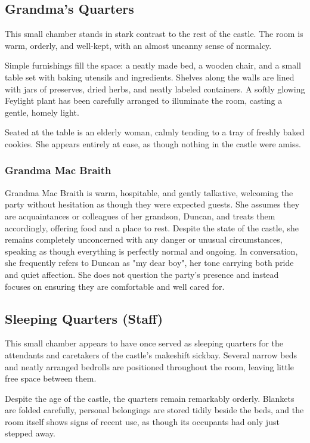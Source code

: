 \subsection*{ Grandma's Quarters}
{\entryfont This small chamber stands in stark contrast to the rest of the castle. The room is warm, orderly, and well-kept, with an almost uncanny sense of normalcy.

Simple furnishings fill the space: a neatly made bed, a wooden chair, and a small table set with baking utensils and ingredients. Shelves along the walls are lined with jars of preserves, dried herbs, and neatly labeled containers. A softly glowing Feylight plant has been carefully arranged to illuminate the room, casting a gentle, homely light.

Seated at the table is an elderly woman, calmly tending to a tray of freshly baked cookies. She appears entirely at ease, as though nothing in the castle were amiss.}
\subsubsection*{Grandma Mac Braith}
{\entryfont Grandma Mac Braith is warm, hospitable, and gently talkative, welcoming the party without hesitation as though they were expected guests. She assumes they are acquaintances or colleagues of her grandson, Duncan, and treats them accordingly, offering food and a place to rest. Despite the state of the castle, she remains completely unconcerned with any danger or unusual circumstances, speaking as though everything is perfectly normal and ongoing. In conversation, she frequently refers to Duncan as "my dear boy", her tone carrying both pride and quiet affection. She does not question the party's presence and instead focuses on ensuring they are comfortable and well cared for.}
\subsection*{ Sleeping Quarters (Staff)}
{\entryfont This small chamber appears to have once served as sleeping quarters for the attendants and caretakers of the castle's makeshift sickbay. Several narrow beds and neatly arranged bedrolls are positioned throughout the room, leaving little free space between them.

Despite the age of the castle, the quarters remain remarkably orderly. Blankets are folded carefully, personal belongings are stored tidily beside the beds, and the room itself shows signs of recent use, as though its occupants had only just stepped away.}
